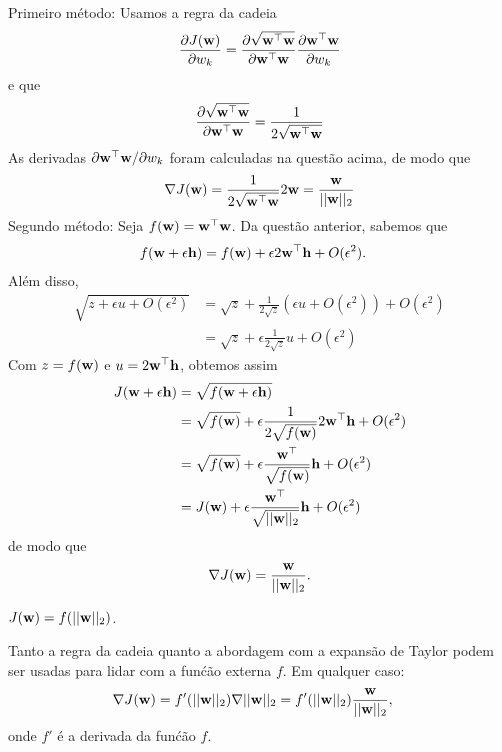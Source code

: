 \begin{exenumerate}
\begin{solution}
        Primeiro m\'etodo: Usamos a regra da cadeia
        \begin{equation}
            \frac{\partial{J(\mathbf{w})}}{\partial{w_k}} = \frac{\partial \sqrt{\mathbf{w}^\top \mathbf{w}}}{\partial \mathbf{w}^\top \mathbf{w}}\frac{\partial \mathbf{w}^\top \mathbf{w}}{\partial w_k}
        \end{equation}
        e que
        \begin{equation}
            \frac{\partial \sqrt{\mathbf{w}^\top \mathbf{w}}}{\partial \mathbf{w}^\top \mathbf{w}} = \frac{1}{2\sqrt{\mathbf{w}^\top \mathbf{w}}}
        \end{equation}
        As derivadas $\partial \mathbf{w}^\top \mathbf{w}/\partial w_k$ foram calculadas na quest\~ao acima, de modo que
        \begin{equation}
            \nabla J(\mathbf{w}) = \frac{1}{2\sqrt{\mathbf{w}^\top \mathbf{w}}} 2 \mathbf{w} = \frac{\mathbf{w}}{||\mathbf{w}||_2}
        \end{equation}
        Segundo m\'etodo: Seja $f(\mathbf{w}) = \mathbf{w}^\top \mathbf{w}$. Da quest\~ao anterior, sabemos que
        \begin{align}
            f(\mathbf{w} + \epsilon \mathbf{h}) & = f(\mathbf{w}) + \epsilon 2\mathbf{w}^\top \mathbf{h} + O(\epsilon^2).
        \end{align}
        Al\'em disso,
        \begin{align}
            \sqrt{z + \epsilon u + O(\epsilon^2)} & = \sqrt{z} + \frac{1}{2\sqrt{z}}(\epsilon u + O(\epsilon^2)) + O(\epsilon^2)\\
            & = \sqrt{z} + \epsilon \frac{1}{2\sqrt{z}} u + O(\epsilon^2)
        \end{align}
        Com $z=f(\mathbf{w})$ e $u = 2 \mathbf{w}^\top \mathbf{h}$, obtemos assim
        \begin{align}
            J(\mathbf{w} + \epsilon \mathbf{h}) &= \sqrt{f(\mathbf{w}+\epsilon \mathbf{h})} \\
            &= \sqrt{f(\mathbf{w})} + \epsilon \frac{1}{2\sqrt{f(\mathbf{w})}} 2\mathbf{w}^\top \mathbf{h} + O(\epsilon^2)\\
            &= \sqrt{f(\mathbf{w})} + \epsilon \frac{\mathbf{w}^\top}{\sqrt{f(\mathbf{w})}}\mathbf{h} + O(\epsilon^2)\\
            &= J(\mathbf{w}) +  \epsilon \frac{\mathbf{w}^\top}{\sqrt{||\mathbf{w}||_2}}\mathbf{h} + O(\epsilon^2)
        \end{align}
        de modo que
        \begin{equation}
            \nabla J(\mathbf{w}) = \frac{\mathbf{w}}{||\mathbf{w}||_2}.
        \end{equation}
        
    \end{solution}
    
    \item $J(\mathbf{w})=f(||\mathbf{w}||_2)$.
    \begin{solution}
        Tanto a regra da cadeia quanto a abordagem com a expans\~ao de Taylor podem ser usadas
        para lidar com a fun\'c\~ao externa $f$. Em qualquer caso:
        \begin{align}
            \nabla J(\mathbf{w}) &= f'(||\mathbf{w}||_2) \nabla ||\mathbf{w}||_2 = f'(||\mathbf{w}||_2) \frac{\mathbf{w}}{||\mathbf{w}||_2},
        \end{align}
        onde $f'$ \'e a derivada da fun\'c\~ao $f$.
    \end{solution}
    

\end{exenumerate}
